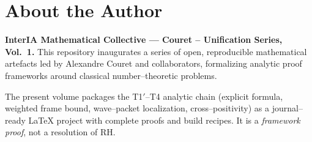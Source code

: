 \section*{About the Author}

\textbf{InterIA Mathematical Collective — Couret – Unification Series, Vol.~1.}
This repository inaugurates a series of open, reproducible mathematical
artefacts led by Alexandre Couret and collaborators, formalizing
analytic proof frameworks around classical number–theoretic problems.

\medskip

\noindent The present volume packages the T1$′$–T4 analytic chain
(explicit formula, weighted frame bound, wave–packet localization,
cross–positivity) as a journal–ready LaTeX project with complete proofs
and build recipes. It is a \emph{framework proof}, not a resolution of RH.
